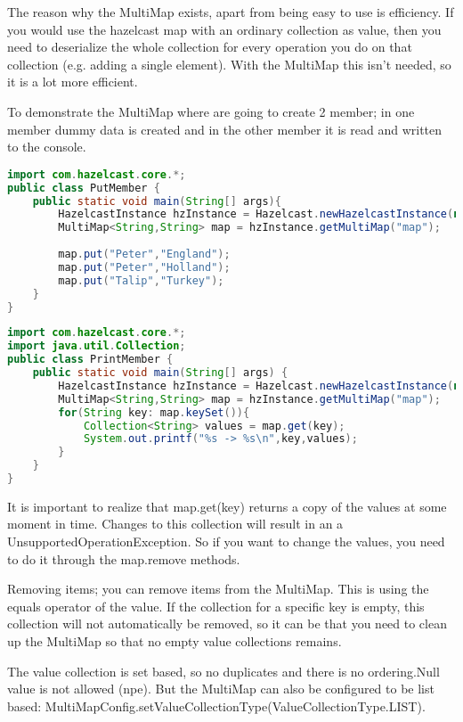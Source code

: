 The reason why the MultiMap exists, apart from being easy to use is efficiency. If you would use the hazelcast map with an ordinary collection as value, then you need to deserialize the whole collection for every operation you do on that collection (e.g. adding a single element). With the MultiMap this isn't needed, so it is a lot more efficient.

To demonstrate the MultiMap where are going to create 2 member; in one member dummy data is created and in the other member it is read and written to the console.
\begin{lstlisting}[language=java]
import com.hazelcast.core.*;
public class PutMember {
    public static void main(String[] args){
        HazelcastInstance hzInstance = Hazelcast.newHazelcastInstance(null);
        MultiMap<String,String> map = hzInstance.getMultiMap("map");
        
        map.put("Peter","England");
        map.put("Peter","Holland");
        map.put("Talip","Turkey");
    }
}
\end{lstlisting}

\begin{lstlisting}[language=java]
import com.hazelcast.core.*;
import java.util.Collection;
public class PrintMember {
    public static void main(String[] args) {
        HazelcastInstance hzInstance = Hazelcast.newHazelcastInstance(null);
        MultiMap<String,String> map = hzInstance.getMultiMap("map");
        for(String key: map.keySet()){
            Collection<String> values = map.get(key);
            System.out.printf("%s -> %s\n",key,values);
        }
    }
}
\end{lstlisting}
It is important to realize that map.get(key) returns a copy of the values at some moment in time. Changes to this collection will result in an a UnsupportedOperationException. So if you want to change the values, you need to do it through the map.remove methods.

Removing items; you can remove items from the MultiMap. This is using the equals operator of the value. If the collection for a specific key is empty, this collection will not automatically be removed, so it can be that you need to clean up the MultiMap so that no empty value collections remains.

The value collection is set based, so no duplicates and there is no ordering.Null value is not allowed (npe). But the MultiMap can also be configured to be list based: MultiMapConfig.setValueCollectionType(ValueCollectionType.LIST). 

